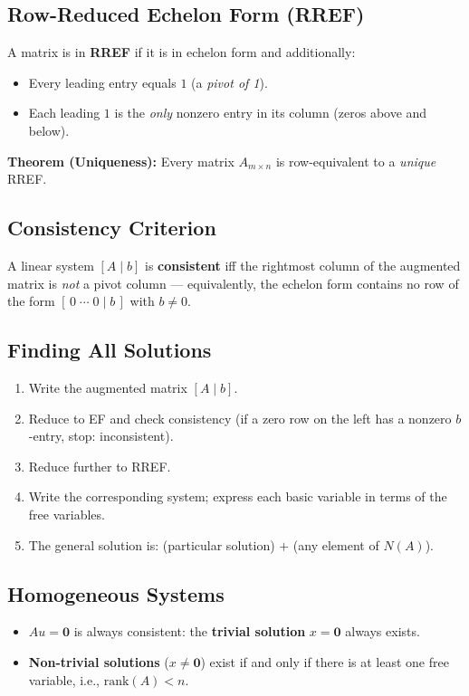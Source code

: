 \documentclass[hidelinks]{article}
\begin{document}
\subsection{Row-Reduced Echelon Form (RREF)}
A matrix is in \textbf{RREF} if it is in echelon form and additionally:
\begin{itemize}
    \item Every leading entry equals $1$ (a \emph{pivot of 1}).
    \item Each leading $1$ is the \emph{only} nonzero entry in its column (zeros above and below).
\end{itemize}
\textbf{Theorem (Uniqueness):} Every matrix $A_{m\times n}$ is row-equivalent to a \emph{unique} RREF.

\subsection{Consistency Criterion}
A linear system $[A\mid b]$ is \textbf{consistent} iff the rightmost column of the augmented matrix is \emph{not} a pivot column — equivalently, the echelon form contains no row of the form $[\,0 \;\cdots\; 0 \mid b\,]$ with $b \neq 0$.

\subsection{Finding All Solutions}
\begin{enumerate}
    \item Write the augmented matrix $[A \mid b]$.
    \item Reduce to EF and check consistency (if a zero row on the left has a nonzero $b$-entry, stop: inconsistent).
    \item Reduce further to RREF.
    \item Write the corresponding system; express each basic variable in terms of the free variables.
    \item The general solution is: (particular solution) $+$ (any element of $N(A)$).
\end{enumerate}

\subsection{Homogeneous Systems}
\begin{itemize}
    \item $Au = \mathbf{0}$ is always consistent: the \textbf{trivial solution} $x = \mathbf{0}$ always exists.
    \item \textbf{Non-trivial solutions} ($x \neq \mathbf{0}$) exist if and only if there is at least one free variable, i.e., $\mathrm{rank}(A) < n$.
\end{itemize}
\end{document}
